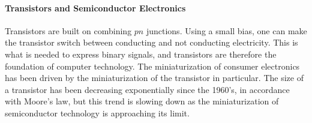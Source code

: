 \paragraph{Transistors and Semiconductor Electronics}
Transistors are built on combining $pn$ junctions. Using a small bias, one can make the transistor switch between conducting and not conducting electricity. This is what is needed to express binary signals, and transistors are therefore the foundation of computer technology. The miniaturization of consumer electronics has been driven by the miniaturization of the transistor in particular. The size of a transistor has been decreasing exponentially since the 1960's, in accordance with Moore's law, but this trend is slowing down as the miniaturization of semiconductor technology is approaching its limit.